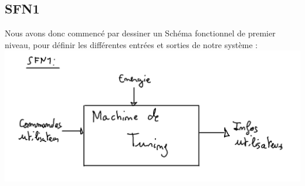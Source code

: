 \documentclass[12pt]{report}
\begin{document}
	 \subsection{SFN1}
	 Nous avons donc commencé par dessiner un Schéma fonctionnel de premier niveau, pour définir les différentes entrées et sorties de notre système :\\
	 \includegraphics[width=\textwidth]{img/SFN1}
\end{document}
